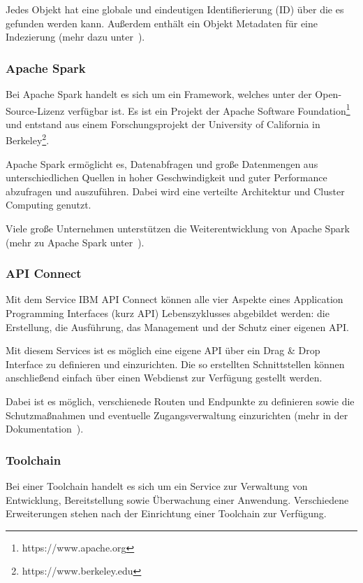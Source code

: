 Jedes Objekt hat eine globale und eindeutigen Identifierierung (ID) über die es gefunden werden kann. Außerdem enthält
ein Objekt Metadaten für eine Indezierung (mehr dazu unter~\cite{book_grundlagen_objectstorage}).

\subsubsection{Apache Spark}
Bei Apache Spark handelt es sich um ein Framework, welches unter der Open-Source-Lizenz verfügbar ist. Es ist ein Projekt
der Apache Software Foundation\footnote{https://www.apache.org} und entstand aus einem Forschungsprojekt der University
of California in Berkeley\footnote{https://www.berkeley.edu}.

Apache Spark ermöglicht es, Datenabfragen und große Datenmengen aus unterschiedlichen Quellen in hoher Geschwindigkeit
und guter Performance abzufragen und auszuführen. Dabei wird eine verteilte Architektur und Cluster Computing genutzt.

Viele große Unternehmen unterstützen die Weiterentwicklung von Apache Spark (mehr zu Apache Spark
unter~\cite{book_grundlagen_apachespark}).

\subsubsection{API Connect}
Mit dem Service IBM API Connect können alle vier Aspekte eines Application Programming Interfaces (kurz API)
Lebenszyklusses abgebildet werden: die Erstellung, die Ausführung, das Management und der Schutz einer eigenen API.

Mit diesem Services ist es möglich eine eigene API über ein Drag \& Drop Interface zu definieren und einzurichten. Die
so erstellten Schnittstellen können anschließend einfach über einen Webdienst zur Verfügung gestellt werden.

Dabei ist es möglich, verschienede Routen und Endpunkte zu definieren sowie die Schutzmaßnahmen und eventuelle
Zugangsverwaltung einzurichten (mehr in der Dokumentation~\cite{book_grundlagen_apiconnect}).

\subsubsection{Toolchain}
Bei einer Toolchain handelt es sich um ein Service zur Verwaltung von Entwicklung, Bereitstellung sowie Überwachung
einer Anwendung. Verschiedene Erweiterungen stehen nach der Einrichtung einer Toolchain zur Verfügung.

